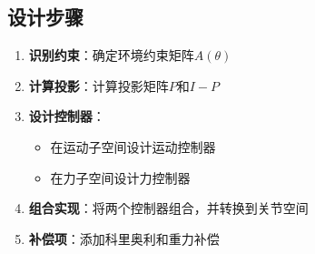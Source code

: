 \documentclass[12pt,a4paper]{article}
\begin{document}
\subsection{设计步骤}

\begin{enumerate}
\item \textbf{识别约束}：确定环境约束矩阵$A(\theta)$
\item \textbf{计算投影}：计算投影矩阵$P$和$I-P$
\item \textbf{设计控制器}：
\begin{itemize}
\item 在运动子空间设计运动控制器
\item 在力子空间设计力控制器
\end{itemize}
\item \textbf{组合实现}：将两个控制器组合，并转换到关节空间
\item \textbf{补偿项}：添加科里奥利和重力补偿
\end{enumerate}
\end{document}
